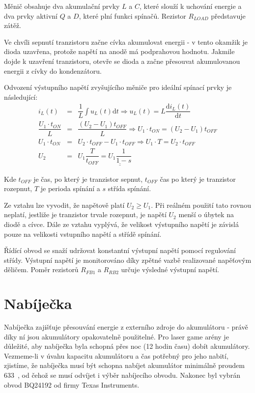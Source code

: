 Měnič obsahuje dva akumulační prvky $L$ a $C$, které slouží k uchování energie a dva prvky aktivní $Q$ a $D$, které plní funkci spínačů. Rezistor $R_{LOAD}$ představuje zátěž.

Ve chvíli sepnutí tranzistoru začne cívka akumulovat energii - v tento okamžik je dioda uzavřena, protože napětí na anodě má podprahovou hodnotu. Jakmile dojde k uzavření tranzistoru, otevře se dioda a začne přesouvat akumulovanou energii z cívky do kondenzátoru.

Odvození výstupního napětí zvyšujícího měniče pro ideální spínací prvky je následující:
\begin{eqnarray}
    i_L(t) &=& \dfrac{1}{L} \int u_L(t) \mathrm{d}t \Rightarrow u_L(t) = L \dfrac{\mathrm{d}i_L(t)}{\mathrm{d}t}
    \nonumber\\
    \dfrac{U_1 \cdot t_{ON}}{L} &=& \dfrac{(U_2 - U_1) t_{OFF}}{L} \Rightarrow U_1 \cdot t_{ON} = (U_2 - U_1) t_{OFF}
    \nonumber\\
    U_1 \cdot t_{ON} &=& U_2 \cdot t_{OFF} - U_1 \cdot t_{OFF} \Rightarrow U_1 \cdot T = U_2 \cdot t_{OFF}
    \nonumber\\
    U_2 &=& U_1 \dfrac{T}{t_{OFF}} = \underline{\underline{U_1 \dfrac{1}{1-s}}}
    \nonumber
\end{eqnarray}

Kde $t_{OFF}$ je čas, po který je tranzistor sepnut, $t_{OFF}$ čas po který je tranzistor rozepnut, $T$ je perioda spínání a $s$ střída spínání.

Ze vztahu lze vyvodit, že napětově platí $U_2 \geq U_1$. Při reálném použití tato rovnou neplatí, jestliže je tranzistor trvale rozepnut, je napětí $U_2$ menší o úbytek na diodě a cívce. Dále ze vztahu vyplývá, že velikost výstupního napětí je závislá pouze na velikosti vstupního napětí a střídě spínání.

Řídící obvod se snaží udržovat konstantní výstupní napětí pomocí regulování střídy. Výstupní napětí je monitorováno díky zpětné vazbě realizované napěťovým děličem. Poměr rezistorů $R_{FB1}$ a $R_{RB2}$ určuje výsledné výstupní napětí.

\section{Nabíječka}
Nabíječka zajišťuje přesouvání energie z externího zdroje do akumulátoru - právě díky ní jsou akumulátory opakovatelně použitelné. Pro laser game arény je důležité, aby nabíječka byla schopná přes noc (12 hodin času) dobít akumulátory. Vezmeme-li v úvahu kapacitu akumulátoru a čas potřebný pro jeho nabití, zjistíme, že nabíječka musí být schopna nabíjet akumulátor minimálně proudem 633~, od čehož se musí odvíjet i výběr nabíjecího obvodu. Nakonec byl vybrán obvod BQ24192 od firmy Texas Instruments.

